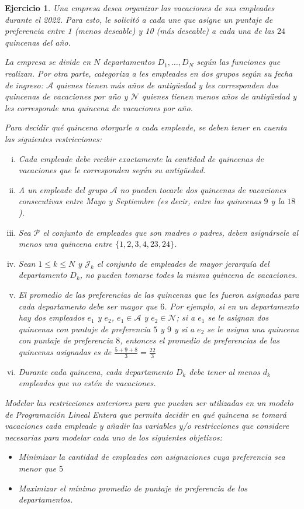 \documentclass[a4paper,oneside,12pt]{amsart}
\newtheorem{quest}{Ejercicio}
\begin{document}


\begin{quest} Una empresa desea organizar las vacaciones de sus empleades durante el 2022. Para esto, le solicitó a cada une que asigne un puntaje de preferencia entre 1 (menos deseable) y 10 (más deseable) a cada una de las $24$ quincenas del año. 
    
La empresa se divide en $N$ departamentos $D_1,\dots, D_N$ según las funciones que realizan. Por otra parte, categoriza a les empleades en dos grupos según su fecha de ingreso: $\mathcal{A}$ quienes tienen más años de antigüedad y les corresponden dos quincenas de vacaciones por año y $\mathcal{N}$ quienes tienen menos años de antigüedad y les corresponde una quincena de vacaciones por año.

Para decidir qué quincena otorgarle a cada empleade, se deben tener en cuenta las siguientes restricciones:
\begin{enumerate}[i.]
    \item Cada empleade debe recibir exactamente la cantidad de quincenas de vacaciones que le corresponden según su antigüedad.
    \item A un empleade del grupo $\mathcal{A}$ no pueden tocarle dos quincenas de vacaciones consecutivas entre Mayo y Septiembre (es decir, entre las quincenas $9$ y la $18$).
    \item Sea $\mathcal{P}$ el conjunto de empleades que son madres o padres, deben asignársele al menos una quincena entre $\{1, 2, 3, 4, 23, 24\}$.
    \item Sean $1\leq k\leq N$ y $\mathcal{J}_k$ el conjunto de empleades de mayor jerarquía del departamento $D_k$, no pueden tomarse todes la misma quincena de vacaciones.
    \item El promedio de las preferencias de las quincenas que les fueron asignadas para cada departamento debe ser mayor que $6$. Por ejemplo, si en un departamento hay dos empleados $e_1$ y $e_2$, $e_1\in\mathcal{A}$ y $e_2\in\mathcal{N}$; si a $e_1$ se le asignan dos quincenas con puntaje de preferencia $5$ y $9$ y si a $e_2$ se le asigna una quincena con puntaje de preferencia $8$, entonces el promedio de preferencias de las quincenas asignadas es de $\frac{5+9+8}{3}=\frac{22}{3}$
    \item Durante cada quincena, cada departamento $D_k$ debe tener al menos $d_k$ empleades que no estén de vacaciones.
\end{enumerate}
    
Modelar las restricciones anteriores para que puedan ser utilizadas en un modelo de Programación Lineal Entera que permita decidir en qué quincena se tomará vacaciones cada empleade y añadir las variables y/o restricciones que considere necesarias para modelar cada uno de los siguientes objetivos: 
\begin{itemize}
    \item[a)] Minimizar la cantidad de empleades con asignaciones cuya preferencia sea menor que $5$
    \item[b)] Maximizar el mínimo promedio de puntaje de preferencia de los departamentos.
\end{itemize}
\end{quest}
\end{document}
